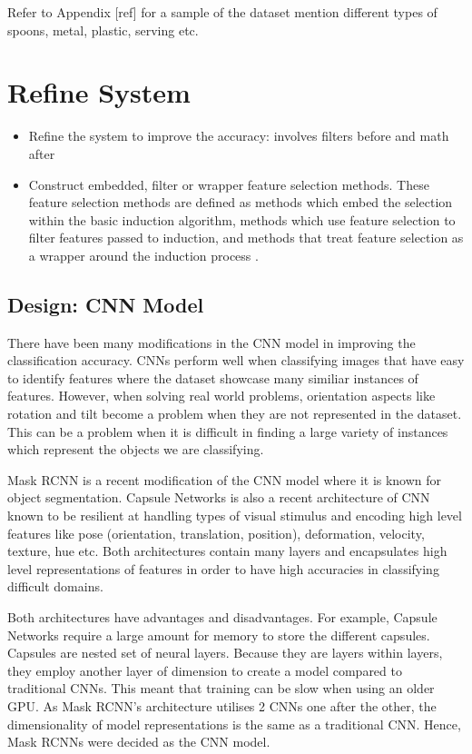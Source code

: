 Refer to Appendix [ref] for a sample of the dataset 
mention different types of spoons, metal, plastic, serving etc.

\section{Refine System}
\begin{itemize}
	\item Refine the system to improve the accuracy: involves filters before and math after
	\item Construct embedded, filter or wrapper feature selection methods. These feature selection methods are defined as methods which embed the selection within the basic induction algorithm, methods which use feature selection to filter features passed to induction, and methods that treat feature selection as a wrapper around the induction process \cite{blum1997selection}.
\end{itemize}

\subsection{Design: CNN Model}
There have been many modifications in the CNN model in improving the classification accuracy. CNNs perform well when classifying images that have easy to identify features where the dataset showcase many similiar instances of features. However, when solving real world problems, orientation aspects like rotation and tilt become a problem when they are not represented in the dataset. This can be a problem when it is difficult in finding a large variety of instances which represent the objects we are classifying.


Mask RCNN is a recent modification of the CNN model where it is known for object segmentation. 
Capsule Networks is also a recent architecture of CNN known to be resilient at handling types of visual stimulus and encoding high level features like pose (orientation, translation, position), deformation, velocity, texture, hue etc. Both architectures contain many layers and encapsulates high level representations of features in order to have high accuracies in classifying difficult domains.

Both architectures have advantages and disadvantages. For example, Capsule Networks require a large amount for memory to store the different capsules. Capsules are nested set of neural layers. Because they are layers within layers, they employ another layer of dimension to create a model compared to traditional CNNs. This meant that training can be slow when using an older GPU. As Mask RCNN's architecture utilises 2 CNNs one after the other, the dimensionality of model representations is the same as a traditional CNN. Hence, Mask RCNNs were decided as the CNN model. 
 

